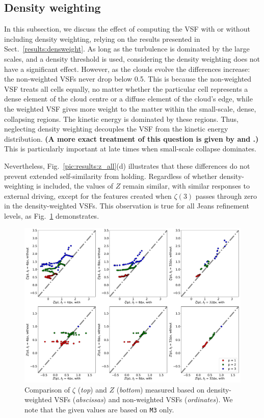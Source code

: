 \subsection{Density weighting}\label{discussion:densweight}

In this subsection, we discuss the effect of computing the VSF with or without including density weighting, relying on the results presented in Sect.~\ref{results:densweight}.
As long as the turbulence is dominated by the large scales, and a density threshold is used, considering the density weighting does not have a significant effect.
However, as the clouds evolve the differences increase:
the non-weighted VSFs never drop below 0.5.
This is because the non-weighted VSF treats all cells equally, no matter whether the particular cell represents a dense element of the cloud centre or a diffuse element of the cloud's edge, while the weighted VSF gives more weight to the matter within the small-scale, dense, collapsing regions.
The kinetic energy is dominated by these regions.
Thus, neglecting density weighting decouples the VSF from the kinetic energy distribution.  \textbf{(A more exact treatment of this question is given by \citet{Kritsuk2013a} and \citet{Banerjee2017,Banerjee2018}.)}
This is particularly important at late times when small-scale collapse dominates.

Nevertheless, Fig.~\ref{pic:results:z_all}(d) illustrates that these differences do not prevent extended self-similarity from holding. 
Regardless of whether density-weighting is included, the values of $Z$ remain similar, with similar responses to external driving, except for the features created when $\zeta(3)$ passes through zero in the density-weighted VSFs.
This observation is true for all Jeans refinement levels, as Fig.~\ref{pic:results:comp_weighting} demonstrates.


\begin{figure}
	\centering
    \includegraphics[width=\textwidth]{comp_weighting.pdf}
    \caption{ Comparison of $\zeta$ (\textit{top}) and $Z$ (\textit{bottom}) measured based on density-weighted VSFs (\textit{abscissas}) and non-weighted VSFs (\textit{ordinates}). We note that the given values are based on \texttt{M3} only.}
    \label{pic:results:comp_weighting}
\end{figure}

